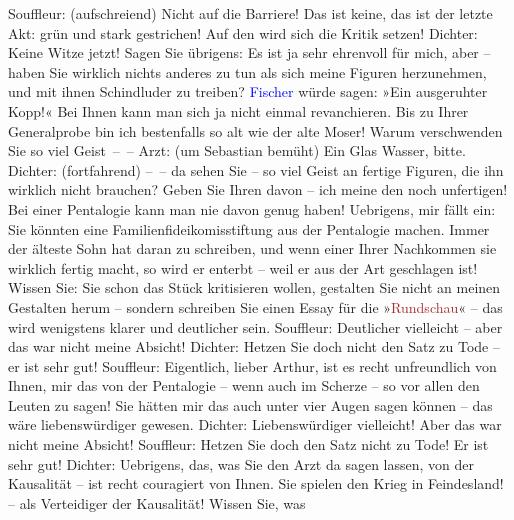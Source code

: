            \pstart
           Souffleur: (aufschreiend) Nicht auf die Barriere! Das ist keine, das ist der
					letzte Akt: grün und stark gestrichen! Auf den wird sich die Kritik setzen!\pend
           \pstart
           Dichter: Keine Witze jetzt! Sagen Sie übrigens: Es ist ja sehr ehrenvoll für
					mich, aber – haben Sie wirklich nichts anderes zu tun als sich meine Figuren
					herzunehmen, und mit ihnen Schindluder zu treiben? \textcolor{blue}{Fischer}{}\ledrightnote{\textcolor{blue}{Samuel Fischer}} würde sagen: »Ein ausgeruhter Kopp!« Bei Ihnen
					kann man sich ja nicht einmal revanchieren. Bis zu Ihrer Generalprobe bin ich
					bestenfalls so alt wie der alte Moser! Warum verschwenden Sie so viel
					Geist – –\pend
           \pstart
           Arzt: (um Sebastian bemüht) Ein Glas Wasser, bitte.\pend
           \pstart
           Dichter: (fortfahrend) – – da sehen Sie – so viel Geist an fertige Figuren,
					die ihn wirklich nicht brauchen? Geben Sie Ihren davon – ich meine den noch
					unfertigen! Bei einer Pentalogie kann man nie davon genug haben! Uebrigens, mir
					fällt ein: Sie könnten eine Familienfideikomisstiftung aus der Pentalogie machen. Immer der älteste Sohn hat daran
					zu schreiben, und wenn einer Ihrer Nachkommen sie wirklich fertig macht, so
						wird{ }{\pb}er enterbt – weil er aus der
					Art geschlagen ist! Wissen Sie:  Sie schon das
					Stück kritisieren wollen, gestalten Sie nicht an meinen Gestalten herum –
					sondern schreiben Sie einen Essay für die »\textcolor{brown}{Rundschau}{}\ledrightnote{\textcolor{brown}{Neue Rundschau, Neue Deutsche Rundschau, Freie Bühne}}« – das wird wenigstens klarer und deutlicher sein.\pend
           \pstart
           Souffleur: Deutlicher vielleicht – aber das war nicht meine Absicht!\pend
           \pstart
           Dichter: Hetzen Sie doch nicht den Satz zu Tode – er ist sehr gut!\pend
           \pstart
           Souffleur: Eigentlich, lieber Arthur, ist es recht unfreundlich von Ihnen, mir
					das von der Pentalogie – wenn auch im Scherze – so vor allen den Leuten zu
					sagen! Sie hätten mir das auch unter vier Augen sagen können – das wäre
					liebenswürdiger gewesen.\pend
           \pstart
           Dichter: Liebenswürdiger vielleicht! Aber das war nicht meine Absicht!\pend
           \pstart
           Souffleur: Hetzen Sie doch den Satz nicht zu Tode! Er ist sehr gut!\pend
           \pstart
           Dichter: Uebrigens, das, was Sie den Arzt da sagen lassen, von der Kausalität –
					ist recht couragiert von Ihnen. Sie spielen den Krieg in Feindesland!  – als Verteidiger der Kausalität! Wissen Sie, was
